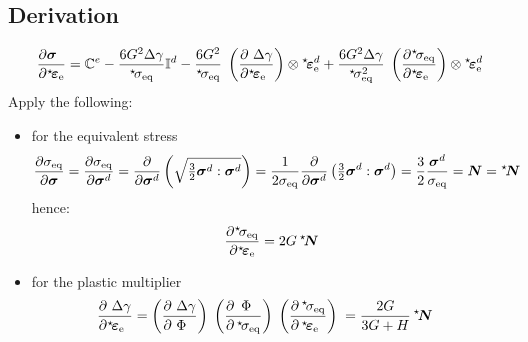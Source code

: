 \documentclass[namecite, fleqn]{goose-article}
\newcommand\leftstar[1]{\hspace*{-.3em}~^\star\!#1}
\begin{document}
\subsection{Derivation}

\begin{align}
    \frac{
        \partial \bm{\sigma} \hfill
    }{
        \partial \leftstar{\bm{\varepsilon}}_\mathrm{e} \hfill
    } =
    \mathbb{C}^e
    - \frac{6 G^2 \Delta \gamma}{\leftstar{\sigma}_\mathrm{eq}} \mathbb{I}^d
    - \frac{6 G^2}{\leftstar{\sigma}_\mathrm{eq}} \;
    \left( \frac{
        \partial ~\Delta \gamma \hfill
    }{
        \partial \leftstar{\bm{\varepsilon}}_\mathrm{e} \hfill
    } \right) \otimes
    \leftstar{\bm{\varepsilon}}_\mathrm{e}^d
    + \frac{6 G^2 \Delta \gamma}{\leftstar{\sigma}_\mathrm{eq}^2} \;
    \left( \frac{
        \partial \leftstar{\sigma}_\mathrm{eq} \hfill
    }{
        \partial \leftstar{\bm{\varepsilon}}_\mathrm{e} \hfill
    } \right) \otimes
    \leftstar{\bm{\varepsilon}}_\mathrm{e}^d
\end{align}
Apply the following:
\begin{itemize}

\item for the equivalent stress
\begin{equation}
    \frac{\partial \sigma_\mathrm{eq}}{\partial \bm{\sigma}}
    = \frac{\partial \sigma_\mathrm{eq}}{\partial \bm{\sigma}^d}
    = \frac{\partial}{\partial \bm{\sigma}^d }
    \left( \sqrt{ \tfrac{3}{2} \bm{\sigma}^d : \bm{\sigma}^d } \right)
    = \frac{1}{2 \sigma_\mathrm{eq} } \frac{\partial}{\partial \bm{\sigma}^d}
    \left( \tfrac{3}{2} \bm{\sigma}^d : \bm{\sigma}^d \right)
    = \frac{3}{2} \frac{\bm{\sigma}^d}{\sigma_\mathrm{eq}} = \bm{N} = \leftstar{\bm{N}}
\end{equation}
hence:
\begin{equation}
    \frac{
        \partial \leftstar{\sigma}_\mathrm{eq}
    }{
        \partial \leftstar{\bm{\varepsilon}}_\mathrm{e}
    } =
    2 G \, \leftstar{\bm{N}}
\end{equation}

\item for the plastic multiplier
\begin{align}
    \frac{
        \partial ~\Delta \gamma \hfill
    }{
        \partial  \leftstar{\bm{\varepsilon}}_\mathrm{e}  \hfill
    }
    =
    \left( \frac{
        \partial ~\Delta \gamma \hfill
    }{
        \partial ~\Phi \hfill
    } \right) \;
    \left( \frac{
        \partial \,~\Phi \hfill
    }{
        \partial  \,\leftstar{\sigma}_\mathrm{eq} \hfill
    } \right) \;
    \left( \frac{
        \partial \,\leftstar{\sigma}_\mathrm{eq} \hfill
    }{
        \partial \,\leftstar{\bm{\varepsilon}}_\mathrm{e} \hfill
    } \right) \;
    &= \frac{2 G}{3 G + H} \, \leftstar{\bm{N}}
\end{align}
\end{itemize}
\end{document}
